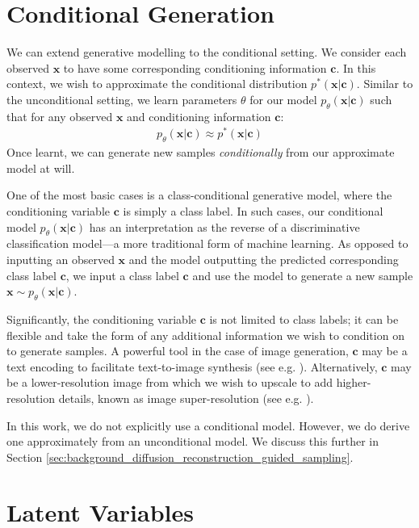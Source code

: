 \documentclass[ oneside,%
                    author={George Herbert},
                    degree={MSci},
                     title={Diffusion Models for Time-Evolving Precipitation Fields},
                  subtitle={}]{dissertation}
\begin{document}
\section{Conditional Generation}
\label{sec:background_conditional}

We can extend generative modelling to the conditional setting. We consider each observed $\mathbf{x}$ to have some corresponding conditioning information $\mathbf{c}$. In this context, we wish to approximate the conditional distribution $p^*(\mathbf{x}|\mathbf{c})$. Similar to the unconditional setting, we learn parameters $\theta$ for our model $p_\theta(\mathbf{x}|\mathbf{c})$ such that for any observed $\mathbf{x}$ and conditioning information $\mathbf{c}$:
\begin{align}
      p_\theta(\mathbf{x}|\mathbf{c})\approx p^*(\mathbf{x}|\mathbf{c})
\end{align}
Once learnt, we can generate new samples \textit{conditionally} from our approximate model at will.

One of the most basic cases is a class-conditional generative model, where the conditioning variable $\mathbf{c}$ is simply a class label. In such cases, our conditional model $p_\theta(\mathbf{x}|\mathbf{c})$ has an interpretation as the reverse of a discriminative classification model---a more traditional form of machine learning. As opposed to inputting an observed $\mathbf{x}$ and the model outputting the predicted corresponding class label $\mathbf{c}$, we input a class label $\mathbf{c}$ and use the model to generate a new sample $\mathbf{x}\sim p_\theta(\mathbf{x}|\mathbf{c})$.

Significantly, the conditioning variable $\mathbf{c}$ is not limited to class labels; it can be flexible and take the form of any additional information we wish to condition on to generate samples. A powerful tool in the case of image generation, $\mathbf{c}$ may be a text encoding to facilitate text-to-image synthesis (see e.g. \cite{Imagen_Saharia,Simple_Diffusion_Hoogeboom}). Alternatively, $\mathbf{c}$ may be a lower-resolution image from which we wish to upscale to add higher-resolution details, known as image super-resolution (see e.g. \cite{Cascaded_Ho}).

In this work, we do not explicitly use a conditional model. However, we do derive one approximately from an unconditional model. We discuss this further in Section \ref{sec:background_diffusion_reconstruction_guided_sampling}.

\section{Latent Variables}
\label{sec:background_latent}
\end{document}
